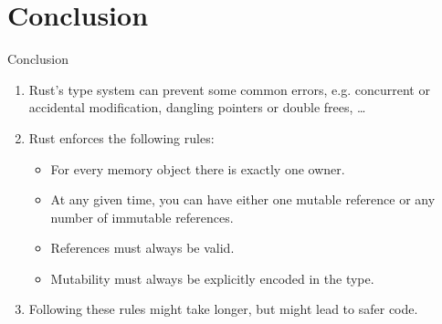 \section*{Conclusion}

\begin{frame}{Conclusion}
  \begin{enumerate}
    \item Rust's type system \alert{can prevent some common errors}, e.g. concurrent or accidental modification, dangling pointers or double frees, \ldots
    \item Rust \alert{enforces} the following rules:
      \begin{itemize}
        \item For every memory object there is \alert{exactly one owner}.
        \item At any given time, you can have \alert{either one mutable reference or any number of immutable references}.
        \item References must always be valid.
        \item Mutability must always be explicitly encoded in the type.
      \end{itemize}
    \item Following these rules \alert{might take longer}, but \alert{might lead to safer code}.
  \end{enumerate}
\end{frame}
